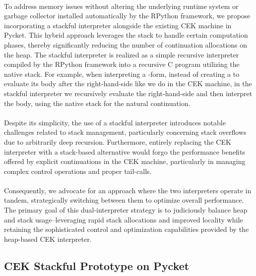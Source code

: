     \paragraph{}%
      To address memory issues without altering the underlying runtime system or garbage collector installed automatically by the RPython framework, we propose incorporating a stackful interpreter alongside the existing CEK machine in Pycket. This hybrid approach leverages the stack to handle certain computation phases, thereby significantly reducing the number of continuation allocations on the heap. The stackful interpreter is realized as a simple recursive interpreter compiled by the RPython framework into a recursive C program utilizing the native stack. For example, when interpreting a -form, instead of creating a  to evaluate its body after the right-hand-side like we do in the CEK machine, in the stackful interpreter we recursively evaluate the right-hand-side and then interpret the body, using the native stack for the natural continuation.

    \paragraph{}%
      Despite its simplicity, the use of a stackful interpreter introduces notable challenges related to stack management, particularly concerning stack overflows due to arbitrarily deep recursion. Furthermore, entirely replacing the CEK interpreter with a stack-based alternative would forgo the performance benefits offered by explicit continuations in the CEK machine, particularly in managing complex control operations and proper tail-calls.

    \paragraph{}%
      Consequently, we advocate for an approach where the two interpreters operate in tandem, strategically switching between them to optimize overall performance. The primary goal of this dual-interpreter strategy is to judiciously balance heap and stack usage--leveraging rapid stack allocations and improved locality while retaining the sophisticated control and optimization capabilities provided by the heap-based CEK interpreter.

    \subsection{CEK \+ Stackful Prototype on Pycket}

